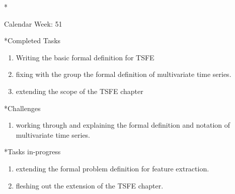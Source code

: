 \documentclass[11pt,a4paper]{article}
\begin{document}
\newpage
\begin{section}*{Calendar Week: 51 \hfill \date{18 December, 2020}}
	
	\begin{subsection}*{Completed Tasks}
		\begin{enumerate}
			\item Writing the basic formal definition for TSFE
			\item fixing with the group the formal definition of multivariate time series.
			\item extending the scope of the TSFE chapter
		\end{enumerate}
	\end{subsection}
	
	\begin{subsection}*{Challenges}
		\begin{enumerate}
			\item working through and explaining the formal definition and notation of multivariate time series.
		\end{enumerate}
	\end{subsection}
	
	\begin{subsection}*{Tasks in-progress}
		\begin{enumerate}
			\item extending the formal problem definition for feature extraction.
			\item fleshing out the extension of the TSFE chapter.
		\end{enumerate}
	\end{subsection}
\end{section}
\end{document}

